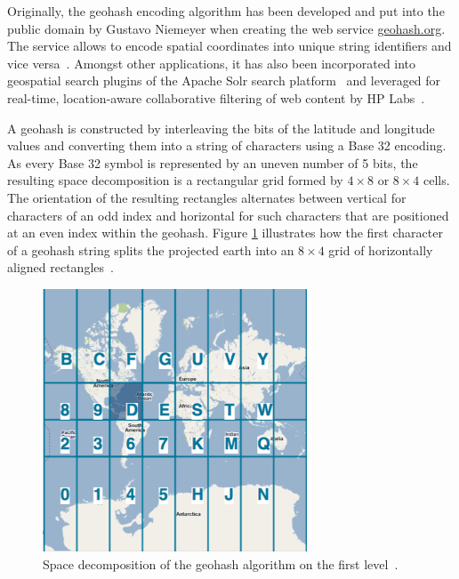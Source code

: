 Originally, the geohash encoding algorithm has been developed and put into the public domain by Gustavo Niemeyer when creating the web service \href{http://geohash.org}{geohash.org}. The service allows to encode spatial coordinates into unique string identifiers and vice versa~\cite{wiki:geohash}. Amongst other applications, it has also been incorporated into geospatial search plugins of the Apache Solr search platform~\cite{Smiley11geohash} and leveraged for real-time, location-aware collaborative filtering of web content by HP Labs~\cite{Sand11geohashapp}.

A geohash is constructed by interleaving the bits of the latitude and longitude values and converting them into a string of characters using a Base 32 encoding. As every Base 32 symbol is represented by an uneven number of 5 bits, the resulting  space decomposition is a rectangular grid formed by $4 \times 8$ or $8 \times 4$ cells. The orientation of the resulting rectangles alternates between vertical for characters of an odd index and horizontal for such characters that are positioned at an even index within the geohash. Figure \ref{fig:geohash} illustrates how the first character of a geohash string splits the projected earth into an $8 \times 4$ grid of horizontally aligned rectangles~\cite{wiki:geohash, Smiley11geohash}.

\begin{figure}[h]
  \begin{center}
    \includegraphics[width=0.7\textwidth]{figures/geohash_example.png}
    \caption{Space decomposition of the geohash algorithm on the first level~\cite{Smiley11geohash}.}
    \label{fig:geohash}
  \end{center}
\end{figure}

